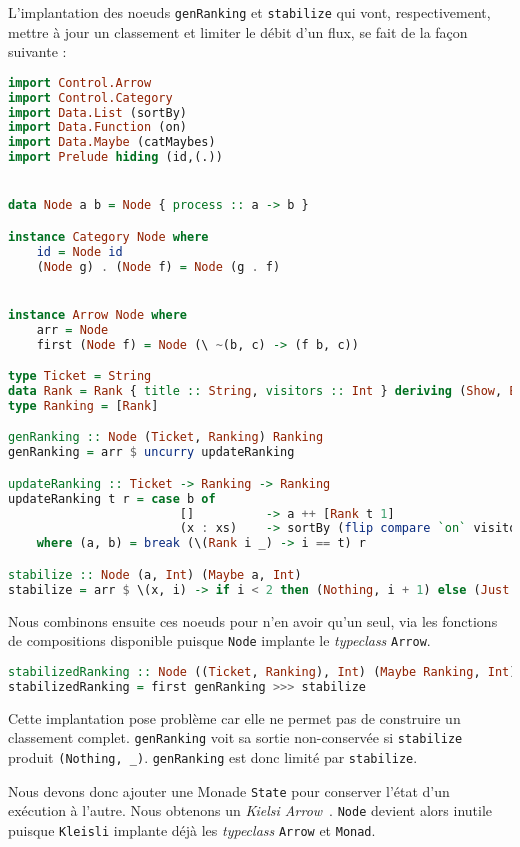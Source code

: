 \documentclass{llncs}
\begin{document}
L'implantation des noeuds \texttt{genRanking} et \texttt{stabilize} qui vont,
respectivement, mettre à jour un classement et limiter le débit d'un flux,
se fait de la façon suivante :
\begin{lstlisting}[language=haskell]
import Control.Arrow
import Control.Category
import Data.List (sortBy)
import Data.Function (on)
import Data.Maybe (catMaybes)
import Prelude hiding (id,(.))


data Node a b = Node { process :: a -> b }

instance Category Node where
    id = Node id
    (Node g) . (Node f) = Node (g . f)


instance Arrow Node where
    arr = Node
    first (Node f) = Node (\ ~(b, c) -> (f b, c))

type Ticket = String
data Rank = Rank { title :: String, visitors :: Int } deriving (Show, Eq)
type Ranking = [Rank]

genRanking :: Node (Ticket, Ranking) Ranking
genRanking = arr $ uncurry updateRanking

updateRanking :: Ticket -> Ranking -> Ranking
updateRanking t r = case b of
                        []          -> a ++ [Rank t 1]
                        (x : xs)    -> sortBy (flip compare `on` visitors) (Rank t (1 + visitors x) : a ++ xs)
    where (a, b) = break (\(Rank i _) -> i == t) r

stabilize :: Node (a, Int) (Maybe a, Int)
stabilize = arr $ \(x, i) -> if i < 2 then (Nothing, i + 1) else (Just x, 0)
\end{lstlisting}

Nous combinons ensuite ces noeuds pour n'en avoir qu'un seul, via les fonctions
de compositions disponible puisque \texttt{Node} implante le \emph{typeclass} \texttt{Arrow}.
\begin{lstlisting}[language=haskell]
stabilizedRanking :: Node ((Ticket, Ranking), Int) (Maybe Ranking, Int)
stabilizedRanking = first genRanking >>> stabilize
\end{lstlisting}

Cette implantation pose problème car elle ne permet pas de construire un classement
complet. \texttt{genRanking} voit sa sortie non-conservée si \texttt{stabilize}
produit \texttt{(Nothing, \_)}.
\texttt{genRanking} est donc limité par \texttt{stabilize}.

Nous devons donc ajouter une Monade \texttt{State} pour conserver l'état d'un exécution à l'autre.
Nous obtenons un \emph{Kielsi Arrow}~\cite{Hughes00}.
\texttt{Node} devient alors inutile puisque \texttt{Kleisli} implante déjà les
\emph{typeclass} \texttt{Arrow} et \texttt{Monad}.
\end{document}
